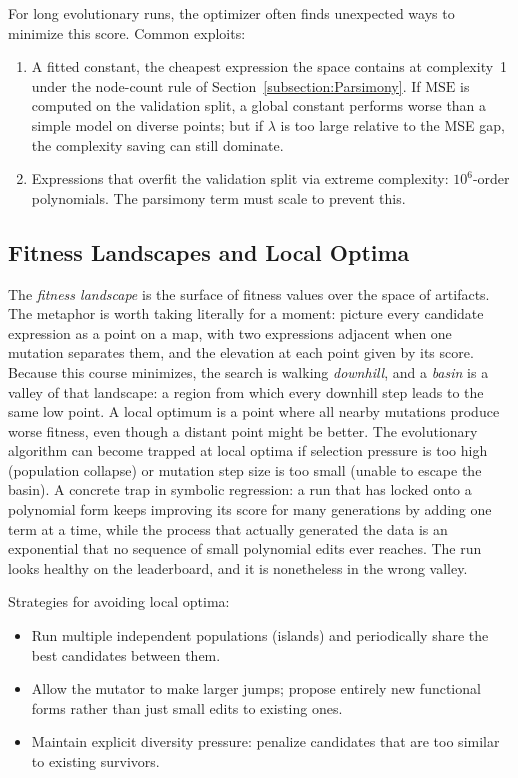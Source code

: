 For long evolutionary runs, the optimizer often finds unexpected ways to minimize this score.
Common exploits:
\begin{enumerate}
\item A fitted constant, the cheapest expression the space contains at complexity~1 under the node-count rule of Section~\ref{subsection:Parsimony}.
If $\mathrm{MSE}$ is computed on the validation split, a global constant performs worse than a simple model on diverse points; but if $\lambda$ is too large relative to the MSE gap, the complexity saving can still dominate.
\item Expressions that overfit the validation split via extreme complexity: $10^6$-order polynomials.
The parsimony term must scale to prevent this.
\end{enumerate}

\subsection{Fitness Landscapes and Local Optima}

The \emph{fitness landscape} is the surface of fitness values over the space of artifacts.
The metaphor is worth taking literally for a moment: picture every candidate expression as a point on a map, with two expressions adjacent when one mutation separates them, and the elevation at each point given by its score.
Because this course minimizes, the search is walking \emph{downhill}, and a \emph{basin} is a valley of that landscape: a region from which every downhill step leads to the same low point.
A local optimum is a point where all nearby mutations produce worse fitness, even though a distant point might be better.
The evolutionary algorithm can become trapped at local optima if selection pressure is too high (population collapse) or mutation step size is too small (unable to escape the basin).
A concrete trap in symbolic regression: a run that has locked onto a polynomial form keeps improving its score for many generations by adding one term at a time, while the process that actually generated the data is an exponential that no sequence of small polynomial edits ever reaches.
The run looks healthy on the leaderboard, and it is nonetheless in the wrong valley.

Strategies for avoiding local optima:
\begin{itemize}
\item Run multiple independent populations (islands) and periodically share the best candidates between them.
\item Allow the mutator to make larger jumps; propose entirely new functional forms rather than just small edits to existing ones.
\item Maintain explicit diversity pressure: penalize candidates that are too similar to existing survivors.
\end{itemize}

